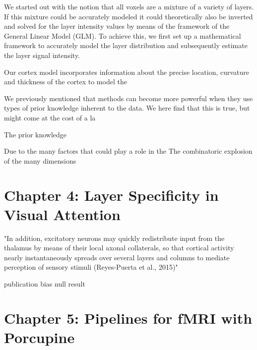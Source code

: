 We started out with the notion that all voxels are a mixture of a variety of layers. If this mixture could be accurately modeled it could theoretically also be inverted and solved for the layer intensity values by means of the framework of the General Linear Model (GLM). To achieve this, we first set up a mathematical framework to accurately model the layer distribution and subsequently estimate the layer signal intensity. 

Our cortex model incorporates information about the precise location, curvature and thickness of the cortex to model the 



We previously mentioned that methods can become more powerful when they use types of prior knowledge inherent to the data. We here find that this is true, but might come at the cost of a la

The prior knowledge 


Due to the many factors that could play a role in the 
The combinatoric explosion of the many dimensions

\section*{Chapter 4: Layer Specificity in Visual Attention}


"In addition, excitatory neurons may quickly redistribute input from the thalamus by means of their local axonal collaterals, 
so that cortical activity nearly instantaneously spreads over several layers and columns to mediate perception of sensory stimuli (Reyes-Puerta et al., 2015)"

publication bias 
null result


\section*{Chapter 5: Pipelines for fMRI with Porcupine}






\linespread{1.5}
\newpage